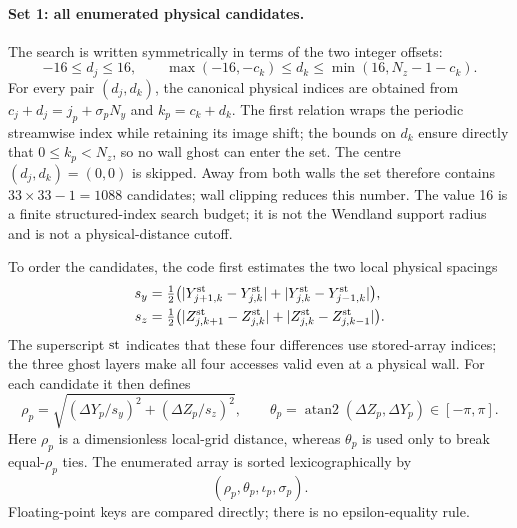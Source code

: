 \documentclass[11pt,a4paper]{article}
\begin{document}
\paragraph{Set 1: all enumerated physical candidates.}
The search is written symmetrically in terms of the two integer offsets:
\begin{equation}
 -16\le d_j\le16,\qquad
 \max(-16,-c_k)\le d_k\le\min(16,N_z-1-c_k).
\label{eq:enum-set}
\end{equation}
For every pair $(d_j,d_k)$, the canonical physical indices are obtained from
$c_j+d_j=j_p+\sigma_p N_y$ and $k_p=c_k+d_k$. The first relation wraps the periodic
streamwise index while retaining its image shift; the bounds on $d_k$ ensure directly
that $0\le k_p<N_z$, so no wall ghost can enter the set. The centre
$(d_j,d_k)=(0,0)$ is skipped. Away from both walls the set therefore contains
$33\mathbin{\times}33-1=1088$ candidates; wall clipping reduces this number. The value
16 is a finite structured-index search budget; it is not the Wendland support radius
and is not a physical-distance cutoff.

To order the candidates, the code first estimates the two local physical spacings
\begin{equation}
\begin{aligned}
 s_y&=\tfrac12\bigl(|Y^{\rm st}_{j+1,k}-Y^{\rm st}_{j,k}|
                   +|Y^{\rm st}_{j,k}-Y^{\rm st}_{j-1,k}|\bigr),\\
 s_z&=\tfrac12\bigl(|Z^{\rm st}_{j,k+1}-Z^{\rm st}_{j,k}|
                   +|Z^{\rm st}_{j,k}-Z^{\rm st}_{j,k-1}|\bigr).
\end{aligned}
\label{eq:project-local-spacing}
\end{equation}
The superscript $\rm st$ indicates that these four differences use stored-array indices;
the three ghost layers make all four accesses valid even at a physical wall.
For each candidate it then defines
\begin{equation}
 \rho_p=\sqrt{(\Delta Y_p/s_y)^2+(\Delta Z_p/s_z)^2},\qquad
 \theta_p=\operatorname{atan2}(\Delta Z_p,\Delta Y_p)\in[-\pi,\pi].
\label{eq:rho-order}
\end{equation}
Here $\rho_p$ is a dimensionless local-grid distance, whereas $\theta_p$ is used only to
break equal-$\rho_p$ ties. The enumerated array is sorted lexicographically by
\begin{equation}
 (\rho_p,\theta_p,\iota_p,\sigma_p).
\label{eq:project-candidate-order}
\end{equation}
Floating-point keys are compared directly; there is no epsilon-equality rule.
\end{document}
